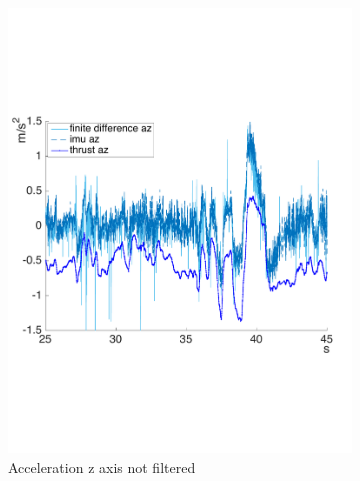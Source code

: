 \begin{figure}[!htbp]
    \begin{subfigure}[b]{0.45\textwidth}
     \includegraphics[width=\textwidth]{img/acc_z_raw.pdf}
        \caption{Acceleration z axis  not filtered}
        \label{fig:comparison_accz}
   \end{subfigure}
     \begin{subfigure}[b]{0.45\textwidth}

\end{subfigure}
\end{figure}
